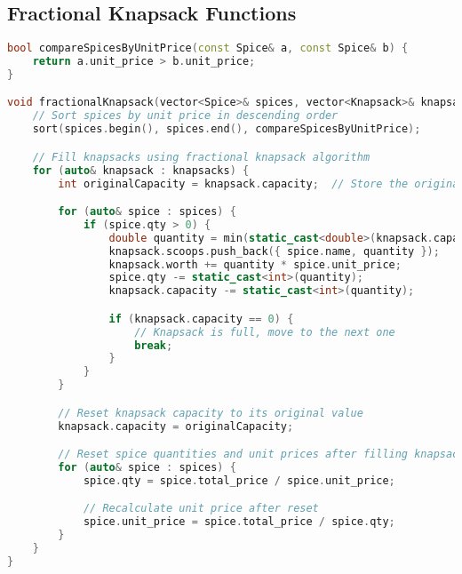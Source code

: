 \documentclass[letterpaper, 10pt,DIV=13]{scrartcl}
\numberwithin{equation}{section} %
\numberwithin{figure}{section} %
\numberwithin{table}{section} %
\begin{document}
\subsection{Fractional Knapsack Functions}
\begin{linenumbers}
\begin{lstlisting}[language=C++, caption={Fractional Knapsack Functions}, label={code:example}]
bool compareSpicesByUnitPrice(const Spice& a, const Spice& b) {
    return a.unit_price > b.unit_price;
}

void fractionalKnapsack(vector<Spice>& spices, vector<Knapsack>& knapsacks) {
    // Sort spices by unit price in descending order
    sort(spices.begin(), spices.end(), compareSpicesByUnitPrice);

    // Fill knapsacks using fractional knapsack algorithm
    for (auto& knapsack : knapsacks) {
        int originalCapacity = knapsack.capacity;  // Store the original capacity

        for (auto& spice : spices) {
            if (spice.qty > 0) {
                double quantity = min(static_cast<double>(knapsack.capacity), static_cast<double>(spice.qty));
                knapsack.scoops.push_back({ spice.name, quantity });
                knapsack.worth += quantity * spice.unit_price;
                spice.qty -= static_cast<int>(quantity);
                knapsack.capacity -= static_cast<int>(quantity);

                if (knapsack.capacity == 0) {
                    // Knapsack is full, move to the next one
                    break; 
                }
            }
        }

        // Reset knapsack capacity to its original value
        knapsack.capacity = originalCapacity;

        // Reset spice quantities and unit prices after filling knapsack
        for (auto& spice : spices) {
            spice.qty = spice.total_price / spice.unit_price;

            // Recalculate unit price after reset
            spice.unit_price = spice.total_price / spice.qty;
        }
    }
}
\end{lstlisting}
\end{linenumbers}
\nolinenumbers
\end{document}
